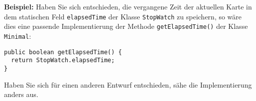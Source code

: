 \textbf{Beispiel:} Haben Sie sich entschieden, die vergangene Zeit der aktuellen Karte in
dem statischen Feld \texttt{elapsedTime} der Klasse \texttt{StopWatch} zu speichern, so w\"are dies eine passende Implementierung der Methode \texttt{getElapsedTime()} der Klasse \texttt{\testAdapter{}Mi\-ni\-mal}:

\begin{lstlisting}
public boolean getElapsedTime() {
  return StopWatch.elapsedTime;
}
\end{lstlisting}

Haben Sie sich f\"ur einen anderen Entwurf entschieden, s\"ahe die Implementierung anders aus. 
